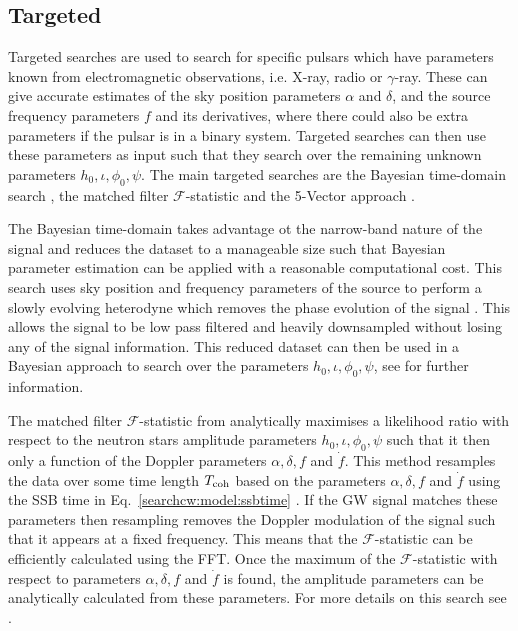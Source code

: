 \subsection{\label{searchcw:search:targeted}Targeted}

Targeted searches are used to search for specific
pulsars which have parameters known from electromagnetic observations, i.e.
X-ray, radio or $\gamma$-ray.  These can give accurate estimates of the sky position parameters
$\alpha$ and $\delta$, and the source frequency parameters $f$ and its
derivatives, where there could also be extra parameters if the pulsar is in a
binary system.
Targeted searches can then use these parameters as input such that they search
over the remaining unknown parameters $h_0, \iota, \phi_0, \psi$.  The
main targeted searches are the Bayesian time-domain search
\citep{dupuis2005BayesianEstimation}, the matched filter
$\mathcal{F}$-statistic \citep{schutz1998DataAnalysis} and the 5-Vector
approach \citep{astone2010MethodDetection}.

The Bayesian time-domain takes advantage ot the narrow-band nature of the signal and reduces the dataset to a manageable size such that Bayesian parameter
estimation can be applied with a reasonable computational cost.  This search
uses sky position and frequency parameters of the source to perform a slowly
evolving heterodyne which removes the phase evolution of the signal
\citep{dupuis2005BayesianEstimation}.  This allows
the signal to be low pass filtered and heavily downsampled without losing any
of the signal information.  This reduced dataset can then be used in a Bayesian
approach to search over the parameters $h_0, \iota, \phi_0, \psi$, see
\citep{dupuis2005BayesianEstimation} for further information.  

The matched filter $\mathcal{F}$-statistic from \citep{schutz1998DataAnalysis} analytically maximises a likelihood ratio with respect to the neutron stars amplitude parameters $h_0, \iota, \phi_0, \psi$ such that it then only a function of the Doppler parameters $\alpha, \delta, f$ and $\dot{f}$. 
This method resamples the data over some time length $T_{\rm coh}$ based on the parameters $\alpha, \delta, f$ and $\dot{f}$ using the \gls{SSB} time in Eq.~\ref{searchcw:model:ssbtime} \citep{schutz1998DataAnalysis}.
If the \gls{GW} signal matches these parameters then resampling removes the Doppler modulation of the signal such that it appears at a fixed frequency.
This means that the $\mathcal{F}$-statistic can be efficiently calculated using the \gls{FFT}. 
Once the maximum of the $\mathcal{F}$-statistic with respect to parameters $\alpha, \delta, f$ and $\dot{f}$  is found, the amplitude parameters can be analytically calculated from these parameters.
For more details on this search see \citep{schutz1998DataAnalysis,brady2000SearchingPeriodic,prix2007SearchContinuous,
aasi2014GRAVITATIONALWAVES}.

